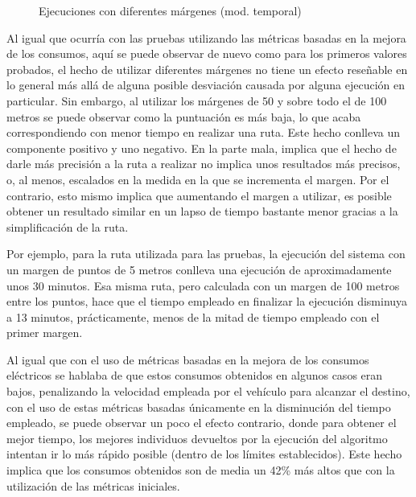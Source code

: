\documentclass[11pt,spanish,listoffigures,listoftables]{tfgetsinf}
\makeatletter
\def\addlegendentry{\csname pgfplots@addlegendentry\endcsname}
\makeatother
\begin{document}
\begin{figure}[!htb]
    \caption{Ejecuciones con diferentes márgenes (mod. temporal)}
    \label{fig:adv_multi_margin_time}
\end{figure}

Al igual que ocurría con las pruebas utilizando las métricas basadas en la mejora de los consumos, aquí se puede observar de nuevo como para los primeros valores probados, el hecho de utilizar diferentes márgenes no tiene un efecto reseñable en lo general más allá de alguna posible desviación causada por alguna ejecución en particular. Sin embargo, al utilizar los márgenes de 50 y sobre todo el de 100 metros se puede observar como la puntuación es más baja, lo que acaba correspondiendo con menor tiempo en realizar una ruta. Este hecho conlleva un componente positivo y uno negativo. En la parte mala, implica que el hecho de darle más precisión a la ruta a realizar no implica unos resultados más precisos, o, al menos, escalados en la medida en la que se incrementa el margen. Por el contrario, esto mismo implica que aumentando el margen a utilizar, es posible obtener un resultado similar en un lapso de tiempo bastante menor gracias a la simplificación de la ruta.

Por ejemplo, para la ruta utilizada para las pruebas, la ejecución del sistema con un margen de puntos de 5 metros conlleva una ejecución de aproximadamente unos 30 minutos. Esa misma ruta, pero calculada con un margen de 100 metros entre los puntos, hace que el tiempo empleado en finalizar la ejecución disminuya a 13 minutos, prácticamente, menos de la mitad de tiempo empleado con el primer margen.

Al igual que con el uso de métricas basadas en la mejora de los consumos eléctricos se hablaba de que estos consumos obtenidos en algunos casos eran bajos, penalizando la velocidad empleada por el vehículo para alcanzar el destino, con el uso de estas métricas basadas únicamente en la disminución del tiempo empleado, se puede observar un poco el efecto contrario, donde para obtener el mejor tiempo, los mejores individuos devueltos por la ejecución del algoritmo intentan ir lo más rápido posible (dentro de los límites establecidos). Este hecho implica que los consumos obtenidos son de media un 42\% más altos que con la utilización de las métricas iniciales.
\end{document}
